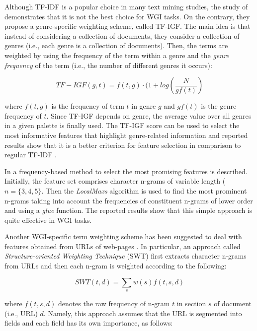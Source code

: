 Although TF-IDF is a popular choice in many text mining studies, the study of \parencite{sugiyanto2014term} demonstrates that it is not the best choice for WGI tasks. On the contrary, they propose a genre-specific weighting scheme, called TF-IGF. The main idea is that instead of considering a collection of documents, they consider a collection of genres (i.e., each genre is a collection of documents). Then, the terms are weighted by using the frequency of the term within a genre and the \textit{genre frequency} of the term (i.e., the number of different genres it occurs): 

 \begin{equation}\label{chap:relevant_work:eq:tf_igf}
 	TF-IGF(g,t) = f(t,g) \cdot (1 + log \left( \frac{N}{gf(t)} \right)
 \end{equation}

 \noindent
where $f(t,g)$ is the frequency of term $t$ in genre $g$ and $gf(t)$ is the genre frequency of $t$. Since TF-IGF depends on genre, the average value over all genres in a given palette is finally used. The TF-IGF score can be used to select the most informative features that highlight genre-related information and reported results show that it is a better criterion for feature selection in comparison to regular TF-IDF \parencite{sugiyanto2014term}.

In \parencite{kanaris2009learning} a frequency-based method to select the most promising features is described. Initially, the feature set comprises character n-grams of variable length ($n = \{3, 4, 5\}$. Then the \textit{LocalMaxs} algorithm is used to find the most prominent n-grams taking into account the frequencies of constituent n-grams of lower order and using a \textit{glue} function. The reported results show that this simple approach is quite effective in WGI tasks.

Another WGI-specific term weighting scheme has been suggested to deal with features obtained from URLs of web-pages \parencite{jebari2014pureURL}. In particular, an approach called \textit{Structure-oriented Weighting Technique} (SWT) first extracts character n-grams from URLs and then each n-gram is weighted according to the following: 

\begin{equation}\label{eq:jebary_url_weigh_cngrams_1}
	SWT(t, d) = \sum_{s} w(s) f(t, s, d)
\end{equation}

\noindent
where $f(t,s,d)$ denotes the raw frequency of n-gram $t$ in section $s$ of document (i.e., URL) $d$. Namely, this approach assumes that the URL is segmented into fields and each field has its own importance, as follows:

